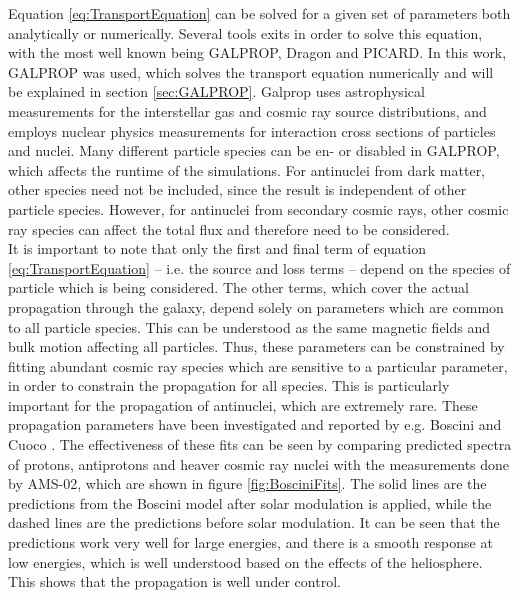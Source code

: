 Equation \ref{eq:TransportEquation} can be solved for a given set of parameters both analytically or numerically. Several tools exits in order to solve this equation, with the most well known being GALPROP\cite{}, Dragon \cite{} and PICARD\cite{}. In this work, GALPROP was used, which solves the transport equation numerically and will be explained in section \ref{sec:GALPROP}. Galprop uses astrophysical measurements for the interstellar gas and cosmic ray source distributions, and employs nuclear physics measurements for interaction cross sections of particles and nuclei. Many different particle species can be en- or disabled in GALPROP, which affects the runtime of the simulations. For antinuclei from dark matter, other species need not be included, since the result is independent of other particle species. However, for antinuclei from secondary cosmic rays, other cosmic ray species can affect the total flux and therefore need to be considered.\\

It is important to note that only the first and final term of equation \ref{eq:TransportEquation} -- i.e. the source and loss terms -- depend on the species of particle which is being considered. The other terms, which cover the actual propagation through the galaxy, depend solely on parameters which are common to all particle species. This can be understood as the same magnetic fields and bulk motion affecting all particles. Thus, these parameters can be constrained by fitting abundant cosmic ray species which are sensitive to a particular parameter, in order to constrain the propagation for all species. This is particularly important for the propagation of antinuclei, which are extremely rare. These propagation parameters have been investigated and reported by e.g. Boscini\cite{} and Cuoco \cite{}. The effectiveness of these fits can be seen by comparing predicted spectra of protons, antiprotons and heaver cosmic ray nuclei with the measurements done by AMS-02, which are shown in figure \ref{fig:BosciniFits}. The solid lines are the predictions from the Boscini model after solar modulation is applied, while the dashed lines are the predictions before solar modulation. It can be seen that the predictions work very well for large energies, and there is a smooth response at low energies, which is well understood based on the effects of the heliosphere. This shows that the propagation is well under control.\\

